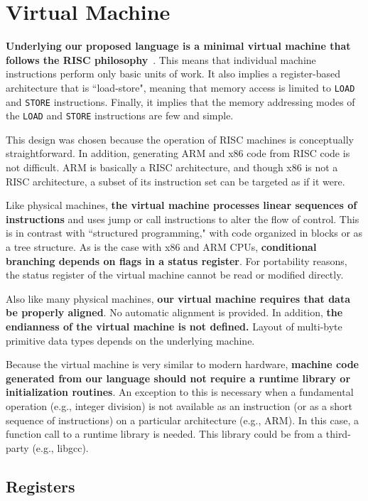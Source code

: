 \section{Virtual Machine}

\textbf{Underlying our proposed language is a
minimal virtual machine that follows the RISC philosophy}~\cite{patterson1985reduced}.
This means that individual machine instructions
perform only basic units of work.
It also implies a register-based architecture that
is ``load-store", meaning that memory access is limited to
\texttt{LOAD} and \texttt{STORE} instructions.
Finally, it implies that the memory addressing modes of the \texttt{LOAD} and
\texttt{STORE} instructions are few and simple.

This design was chosen because the operation of
RISC machines is conceptually straightforward. In addition,
generating ARM and x86 code from RISC code is not difficult.
ARM is basically a RISC architecture, and though x86 is not a RISC architecture,
a subset of its instruction set can be targeted as if it were.

Like physical machines, \textbf{the virtual machine processes
linear sequences of instructions} and uses jump or call instructions
to alter the flow of control. This is in contrast with ``structured programming,"
with code organized in blocks or as a tree structure.
As is the case with x86 and ARM CPUs, \textbf{conditional branching depends on flags in
a status register}. For portability reasons, the status register
of the virtual machine cannot be read or modified directly.

Also like many physical machines, \textbf{our virtual machine requires that data be
properly aligned}. No automatic alignment is provided.
In addition, \textbf{the endianness of the virtual machine is not defined.}
Layout of multi-byte primitive data types depends on the underlying machine.

Because the virtual machine is very similar to modern hardware,
\textbf{machine code generated from our language should not require a
runtime library or initialization routines}. An exception to this is necessary
when a fundamental operation (e.g., integer division) is not available as
an instruction (or as a short sequence of instructions) on a particular
architecture (e.g., ARM).  In this case, a function call to a runtime
library is needed. This library could be from a third-party (e.g., libgcc).

\subsection{Registers}


